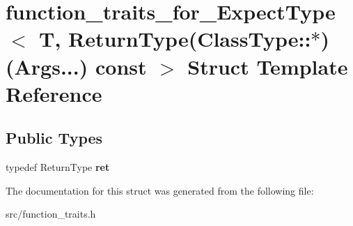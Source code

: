 \hypertarget{structfunction__traits__for___expect_type_3_01_t_00_01_return_type_07_class_type_1_1_5_08_07_args_8_8_8_08_01const_01_01_4}{\section{function\-\_\-traits\-\_\-for\-\_\-\-Expect\-Type$<$ T, Return\-Type(Class\-Type\-:\-:$\ast$)(Args...) const $>$ Struct Template Reference}
\label{structfunction__traits__for___expect_type_3_01_t_00_01_return_type_07_class_type_1_1_5_08_07_args_8_8_8_08_01const_01_01_4}
}
\subsection*{Public Types}
\begin{DoxyCompactItemize}
\item 
\hypertarget{structfunction__traits__for___expect_type_3_01_t_00_01_return_type_07_class_type_1_1_5_08_07_args_8_8_8_08_01const_01_01_4_aa1c2acb6e7a5bb32ad59e8e3e3ac1c45}{typedef Return\-Type {\bfseries ret}}\label{structfunction__traits__for___expect_type_3_01_t_00_01_return_type_07_class_type_1_1_5_08_07_args_8_8_8_08_01const_01_01_4_aa1c2acb6e7a5bb32ad59e8e3e3ac1c45}

\end{DoxyCompactItemize}


The documentation for this struct was generated from the following file\-:\begin{DoxyCompactItemize}
\item 
src/function\-\_\-traits.\-h\end{DoxyCompactItemize}
